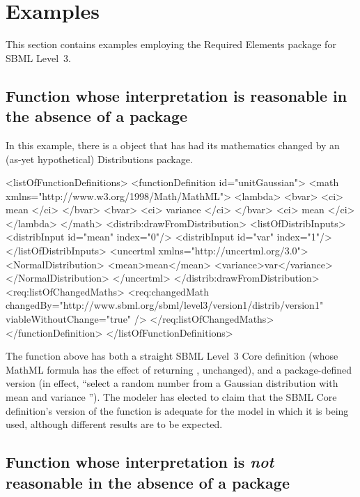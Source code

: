 
\section{Examples}
\label{examples}

This section contains examples employing the Required Elements package for SBML Level~3.

\subsection{Function whose interpretation is reasonable in the absence of a package}

In this example, there is a \FunctionDefinition object that has had its mathematics changed by an (as-yet hypothetical) Distributions package.

\begin{example}
<listOfFunctionDefinitions> 
  <functionDefinition id="unitGaussian"> 
    <math xmlns="http://www.w3.org/1998/Math/MathML"> 
      <lambda>
        <bvar>
          <ci> mean </ci>
        </bvar>
        <bvar>
          <ci> variance </ci>
        </bvar>
        <ci> mean </ci>
      </lambda>
    </math> 
    <distrib:drawFromDistribution>
      <listOfDistribInputs>
        <distribInput id="mean" index="0"/>
        <distribInput id="var" index="1"/>
      </listOfDistribInputs>
      <uncertml xmlns="http://uncertml.org/3.0">
        <NormalDistribution>
          <mean>mean</mean>
          <variance>var</variance>
        </NormalDistribution>
      </uncertml>
    </distrib:drawFromDistribution>
    <req:listOfChangedMaths>
      <req:changedMath changedBy="http://www.sbml.org/sbml/level3/version1/distrib/version1"
                       viableWithoutChange="true" />
    </req:listOfChangedMaths>
  </functionDefinition> 
</listOfFunctionDefinitions> 
\end{example}

The function  above has both a straight SBML Level~3 Core definition (whose MathML formula has the effect of returning , unchanged), and a package-defined version (in effect, ``select a random number from a Gaussian distribution with mean  and variance ''). The modeler has elected to claim that the SBML Core definition's version of the function is adequate for the model in which it is being used, although different results are to be expected.


\subsection{Function whose interpretation is \emph{not} reasonable in the absence of a package}


